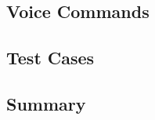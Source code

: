
\subsection{Voice Commands}


\subsection{Test Cases}


\subsection{Summary}
\label{subsec:summary}



% 
